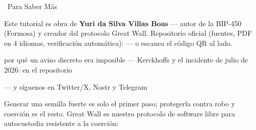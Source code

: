 \documentclass[10pt]{article}
\begin{document}
\begin{infobox}{\faInfoCircle~Para Saber Más}
\begin{minipage}[c]{0.8\textwidth}
Este tutorial es obra de \textbf{Yuri da Silva Villas Boas} --- autor de la BIP-450 (Formosa) y creador del protocolo Great Wall. Repositorio oficial (fuentes, PDF en 4 idiomas, verificación automática): \repolink --- o escanea el código QR al lado.

\begin{description}[itemsep=1pt]
 \item [Artículo corto:] por qué un aviso discreto era imposible --- Kerckhoffs y el incidente de julio de 2026: \paperlink en el repositorio
 \item [Más tutoriales, cursos y comunidad:] \sitelink --- y síguenos en Twitter/X, Nostr y Telegram
 \item [Great Wall:] Generar una semilla fuerte es solo el primer paso; protegerla contra robo y coerción es el resto. Great Wall es nuestro protocolo de software libre para autocustodia resistente a la coerción: \gwlink
\end{description}

\end{minipage}%
\hfill
\begin{minipage}[c]{0.15\textwidth}
\centering
\repoqr
\end{minipage}
\end{infobox}

\end{document}

